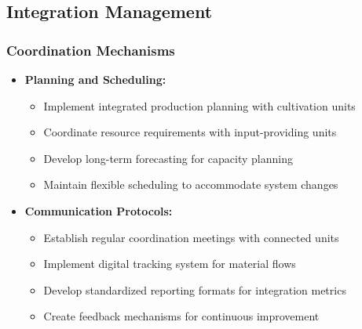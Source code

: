 \subsection{Integration Management}

\subsubsection{Coordination Mechanisms}
\begin{itemize}
    \item \textbf{Planning and Scheduling:}
    \begin{itemize}
        \item Implement integrated production planning with cultivation units
        \item Coordinate resource requirements with input-providing units
        \item Develop long-term forecasting for capacity planning
        \item Maintain flexible scheduling to accommodate system changes
    \end{itemize}
    
    \item \textbf{Communication Protocols:}
    \begin{itemize}
        \item Establish regular coordination meetings with connected units
        \item Implement digital tracking system for material flows
        \item Develop standardized reporting formats for integration metrics
        \item Create feedback mechanisms for continuous improvement
    \end{itemize}
\end{itemize}

